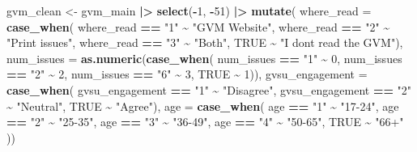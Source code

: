 \documentclass[
]{article}
\newenvironment{Shaded}{\begin{snugshade}}{\end{snugshade}}
\newcommand{\AttributeTok}[1]{\textcolor[rgb]{0.13,0.29,0.53}{#1}}
\newcommand{\ConstantTok}[1]{\textcolor[rgb]{0.56,0.35,0.01}{#1}}
\newcommand{\DecValTok}[1]{\textcolor[rgb]{0.00,0.00,0.81}{#1}}
\newcommand{\FunctionTok}[1]{\textcolor[rgb]{0.13,0.29,0.53}{\textbf{#1}}}
\newcommand{\NormalTok}[1]{#1}
\newcommand{\OtherTok}[1]{\textcolor[rgb]{0.56,0.35,0.01}{#1}}
\newcommand{\SpecialCharTok}[1]{\textcolor[rgb]{0.81,0.36,0.00}{\textbf{#1}}}
\newcommand{\StringTok}[1]{\textcolor[rgb]{0.31,0.60,0.02}{#1}}
\begin{document}
\begin{Shaded}
\begin{Highlighting}[]
\NormalTok{gvm\_clean }\OtherTok{\textless{}{-}}\NormalTok{ gvm\_main }\SpecialCharTok{|\textgreater{}}
  \FunctionTok{select}\NormalTok{(}\SpecialCharTok{{-}}\DecValTok{1}\NormalTok{, }\SpecialCharTok{{-}}\DecValTok{51}\NormalTok{) }\SpecialCharTok{|\textgreater{}}
  \FunctionTok{mutate}\NormalTok{(}
    \AttributeTok{where\_read =} \FunctionTok{case\_when}\NormalTok{(}
\NormalTok{      where\_read }\SpecialCharTok{==} \StringTok{"1"} \SpecialCharTok{\textasciitilde{}} \StringTok{"GVM Website"}\NormalTok{,}
\NormalTok{      where\_read }\SpecialCharTok{==} \StringTok{"2"} \SpecialCharTok{\textasciitilde{}} \StringTok{"Print issues"}\NormalTok{,}
\NormalTok{      where\_read }\SpecialCharTok{==} \StringTok{"3"} \SpecialCharTok{\textasciitilde{}} \StringTok{"Both"}\NormalTok{,}
      \ConstantTok{TRUE} \SpecialCharTok{\textasciitilde{}} \StringTok{"I don\textquotesingle{}t read the GVM"}\NormalTok{),}
    \AttributeTok{num\_issues =} \FunctionTok{as.numeric}\NormalTok{(}\FunctionTok{case\_when}\NormalTok{(}
\NormalTok{      num\_issues }\SpecialCharTok{==} \StringTok{"1"} \SpecialCharTok{\textasciitilde{}} \DecValTok{0}\NormalTok{,}
\NormalTok{      num\_issues }\SpecialCharTok{==} \StringTok{"2"} \SpecialCharTok{\textasciitilde{}} \DecValTok{2}\NormalTok{,}
\NormalTok{      num\_issues }\SpecialCharTok{==} \StringTok{"6"} \SpecialCharTok{\textasciitilde{}} \DecValTok{3}\NormalTok{,}
      \ConstantTok{TRUE} \SpecialCharTok{\textasciitilde{}} \DecValTok{1}\NormalTok{)),}
    \AttributeTok{gvsu\_engagement =} \FunctionTok{case\_when}\NormalTok{(}
\NormalTok{      gvsu\_engagement }\SpecialCharTok{==} \StringTok{"1"} \SpecialCharTok{\textasciitilde{}} \StringTok{"Disagree"}\NormalTok{,}
\NormalTok{      gvsu\_engagement }\SpecialCharTok{==} \StringTok{"2"} \SpecialCharTok{\textasciitilde{}} \StringTok{"Neutral"}\NormalTok{,}
      \ConstantTok{TRUE} \SpecialCharTok{\textasciitilde{}} \StringTok{"Agree"}\NormalTok{),}
    \AttributeTok{age =} \FunctionTok{case\_when}\NormalTok{(}
\NormalTok{      age }\SpecialCharTok{==} \StringTok{"1"} \SpecialCharTok{\textasciitilde{}} \StringTok{"17{-}24"}\NormalTok{,}
\NormalTok{      age }\SpecialCharTok{==} \StringTok{"2"} \SpecialCharTok{\textasciitilde{}} \StringTok{"25{-}35"}\NormalTok{,}
\NormalTok{      age }\SpecialCharTok{==} \StringTok{"3"} \SpecialCharTok{\textasciitilde{}} \StringTok{"36{-}49"}\NormalTok{,}
\NormalTok{      age }\SpecialCharTok{==} \StringTok{"4"} \SpecialCharTok{\textasciitilde{}} \StringTok{"50{-}65"}\NormalTok{,}
      \ConstantTok{TRUE} \SpecialCharTok{\textasciitilde{}} \StringTok{"66+"}
\NormalTok{    ))}
\end{Highlighting}
\end{Shaded}
\end{document}
